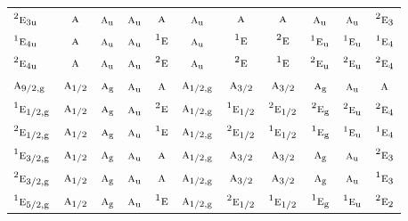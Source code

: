 \documentclass[10pt,a4paper]{article}
\numberwithin{equation}{section}
\newcommand{\irr}[1]{\text{\normalfont\scshape #1}}
\newcommand{\conjpair}[1]{{}^{#1}}
\newcommand{\ptag}[1]{\mathrm{#1}}
\begin{document}
{\begin{longtable}{@{}lcccccccccc@{}}
$\conjpair{2}\irr{e}_{3\ptag{u}}$ & $\irr{a}$ & $\irr{a}_{\ptag{u}}$ & $\irr{a}_{\ptag{u}}$ & $\irr{a}$ & $\irr{a}_{\ptag{u}}$ & $\irr{a}$ & $\irr{a}$ & $\irr{a}_{\ptag{u}}$ & $\irr{a}_{\ptag{u}}$ & $\conjpair{2}\irr{e}_{3}$\\
$\conjpair{1}\irr{e}_{4\ptag{u}}$ & $\irr{a}$ & $\irr{a}_{\ptag{u}}$ & $\irr{a}_{\ptag{u}}$ & $\conjpair{1}\irr{e}$ & $\irr{a}_{\ptag{u}}$ & $\conjpair{1}\irr{e}$ & $\conjpair{2}\irr{e}$ & $\conjpair{1}\irr{e}_{\ptag{u}}$ & $\conjpair{1}\irr{e}_{\ptag{u}}$ & $\conjpair{1}\irr{e}_{4}$\\
$\conjpair{2}\irr{e}_{4\ptag{u}}$ & $\irr{a}$ & $\irr{a}_{\ptag{u}}$ & $\irr{a}_{\ptag{u}}$ & $\conjpair{2}\irr{e}$ & $\irr{a}_{\ptag{u}}$ & $\conjpair{2}\irr{e}$ & $\conjpair{1}\irr{e}$ & $\conjpair{2}\irr{e}_{\ptag{u}}$ & $\conjpair{2}\irr{e}_{\ptag{u}}$ & $\conjpair{2}\irr{e}_{4}$\\
$\irr{a}_{9/2,\ptag{g}}$ & $\irr{a}_{1/2}$ & $\irr{a}_{\ptag{g}}$ & $\irr{a}_{\ptag{u}}$ & $\irr{a}$ & $\irr{a}_{1/2,\ptag{g}}$ & $\irr{a}_{3/2}$ & $\irr{a}_{3/2}$ & $\irr{a}_{\ptag{g}}$ & $\irr{a}_{\ptag{u}}$ & $\irr{a}$\\
$\conjpair{1}\irr{e}_{1/2,\ptag{g}}$ & $\irr{a}_{1/2}$ & $\irr{a}_{\ptag{g}}$ & $\irr{a}_{\ptag{u}}$ & $\conjpair{2}\irr{e}$ & $\irr{a}_{1/2,\ptag{g}}$ & $\conjpair{1}\irr{e}_{1/2}$ & $\conjpair{2}\irr{e}_{1/2}$ & $\conjpair{2}\irr{e}_{\ptag{g}}$ & $\conjpair{2}\irr{e}_{\ptag{u}}$ & $\conjpair{2}\irr{e}_{4}$\\
$\conjpair{2}\irr{e}_{1/2,\ptag{g}}$ & $\irr{a}_{1/2}$ & $\irr{a}_{\ptag{g}}$ & $\irr{a}_{\ptag{u}}$ & $\conjpair{1}\irr{e}$ & $\irr{a}_{1/2,\ptag{g}}$ & $\conjpair{2}\irr{e}_{1/2}$ & $\conjpair{1}\irr{e}_{1/2}$ & $\conjpair{1}\irr{e}_{\ptag{g}}$ & $\conjpair{1}\irr{e}_{\ptag{u}}$ & $\conjpair{1}\irr{e}_{4}$\\
$\conjpair{1}\irr{e}_{3/2,\ptag{g}}$ & $\irr{a}_{1/2}$ & $\irr{a}_{\ptag{g}}$ & $\irr{a}_{\ptag{u}}$ & $\irr{a}$ & $\irr{a}_{1/2,\ptag{g}}$ & $\irr{a}_{3/2}$ & $\irr{a}_{3/2}$ & $\irr{a}_{\ptag{g}}$ & $\irr{a}_{\ptag{u}}$ & $\conjpair{2}\irr{e}_{3}$\\
$\conjpair{2}\irr{e}_{3/2,\ptag{g}}$ & $\irr{a}_{1/2}$ & $\irr{a}_{\ptag{g}}$ & $\irr{a}_{\ptag{u}}$ & $\irr{a}$ & $\irr{a}_{1/2,\ptag{g}}$ & $\irr{a}_{3/2}$ & $\irr{a}_{3/2}$ & $\irr{a}_{\ptag{g}}$ & $\irr{a}_{\ptag{u}}$ & $\conjpair{1}\irr{e}_{3}$\\
$\conjpair{1}\irr{e}_{5/2,\ptag{g}}$ & $\irr{a}_{1/2}$ & $\irr{a}_{\ptag{g}}$ & $\irr{a}_{\ptag{u}}$ & $\conjpair{1}\irr{e}$ & $\irr{a}_{1/2,\ptag{g}}$ & $\conjpair{2}\irr{e}_{1/2}$ & $\conjpair{1}\irr{e}_{1/2}$ & $\conjpair{1}\irr{e}_{\ptag{g}}$ & $\conjpair{1}\irr{e}_{\ptag{u}}$ & $\conjpair{2}\irr{e}_{2}$\\

\end{longtable}}
\end{document}
